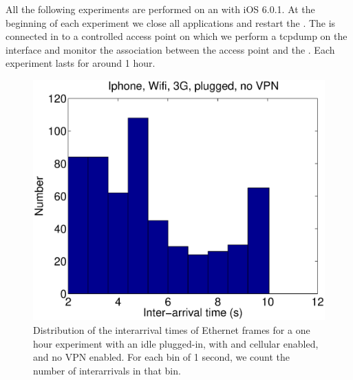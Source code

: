 All the following experiments are performed on an  with iOS
6.0.1.  At the beginning of each experiment we close all applications
and restart the \iphone{}. The \iphone{} is connected in \wifi{} to a
controlled access point on which we perform a tcpdump on the \wifi{}
interface and monitor the \wifi{} association between the access point
and the \iphone{}. Each experiment lasts for around 1 hour. 

\begin{figure}
\centering
        \includegraphics[width=0.8\linewidth]{../../code/pushNotification/Fig/bw_iphone_wifi_3g_plug_novpn_interTs.eps}
  \caption{Distribution of the interarrival times of Ethernet frames
    for a one hour experiment with an idle \iphone{} plugged-in, with \wifi{} and cellular
    enabled, and no VPN enabled. For each bin of 1 second, we count
    the number of interarrivals in that bin.}
  \label{fig:push_w3p_interTs}
  \vspace{\postfigspace}
\end{figure}



